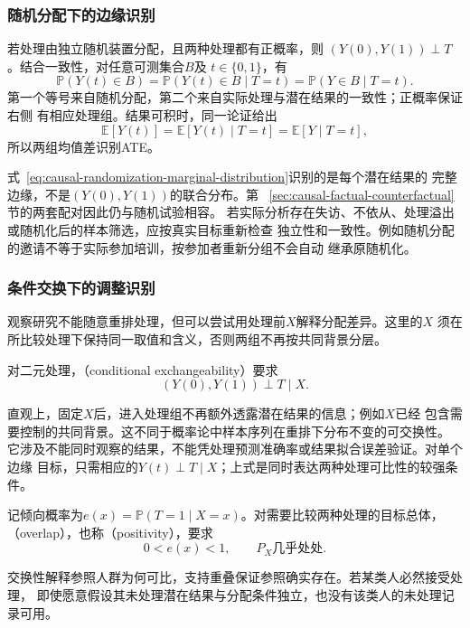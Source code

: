 \subsubsection{随机分配下的边缘识别}
\label{sec:causal-randomized-identification}

若处理由独立随机装置分配，且两种处理都有正概率，则
\((Y(0),Y(1))\perp T\)。结合一致性，对任意可测集合\(B\)及
\(t\in\{0,1\}\)，有
\begin{equation}
  \mathbb P(Y(t)\in B)
  =
  \mathbb P(Y(t)\in B\mid T=t)
  =
  \mathbb P(Y\in B\mid T=t).
  \label{eq:causal-randomization-marginal-distribution}
\end{equation}
第一个等号来自随机分配，第二个来自实际处理与潜在结果的一致性；正概率保证右侧
有相应处理组。结果可积时，同一论证给出
\[
  \mathbb E[Y(t)]
  =\mathbb E[Y(t)\mid T=t]
  =\mathbb E[Y\mid T=t],
\]
所以两组均值差识别ATE。

式~\eqref{eq:causal-randomization-marginal-distribution}识别的是每个潜在结果的
完整边缘，不是\((Y(0),Y(1))\)的联合分布。第
~\ref{sec:causal-factual-counterfactual}节的两套配对因此仍与随机试验相容。
若实际分析存在失访、不依从、处理溢出或随机化后的样本筛选，应按真实目标重新检查
独立性和一致性。例如随机分配的邀请不等于实际参加培训，按参加者重新分组不会自动
继承原随机化。

\subsubsection{条件交换下的调整识别}
\label{sec:causal-adjustment-identification}

观察研究不能随意重排处理，但可以尝试用处理前\(X\)解释分配差异。这里的\(X\)
须在所比较处理下保持同一取值和含义，否则两组不再按共同背景分层。
\begin{definition}[条件交换性]
  \label{def:causal-conditional-exchangeability}
  对二元处理，（conditional exchangeability）要求
  \begin{equation}
    (Y(0),Y(1))\perp T\mid X.
    \label{eq:causal-conditional-exchangeability}
  \end{equation}
\end{definition}
直观上，固定\(X\)后，进入处理组不再额外透露潜在结果的信息；例如\(X\)已经
包含需要控制的共同背景。这不同于概率论中样本序列在重排下分布不变的可交换性。
它涉及不能同时观察的结果，不能凭处理预测准确率或结果拟合误差验证。对单个边缘
目标，只需相应的\(Y(t)\perp T\mid X\)；上式是同时表达两种处理可比性的较强条件。

\begin{definition}[二元处理的支持重叠]
  \label{def:causal-overlap}
  记倾向概率为\(e(x)=\mathbb P(T=1\mid X=x)\)。对需要比较两种处理的目标总体，
  （overlap），也称（positivity），要求
  \begin{equation}
    0<e(x)<1,\qquad P_X\text{几乎处处}.
    \label{eq:causal-overlap}
  \end{equation}
\end{definition}
交换性解释参照人群为何可比，支持重叠保证参照确实存在。若某类人必然接受处理，
即使愿意假设其未处理潜在结果与分配条件独立，也没有该类人的未处理记录可用。

